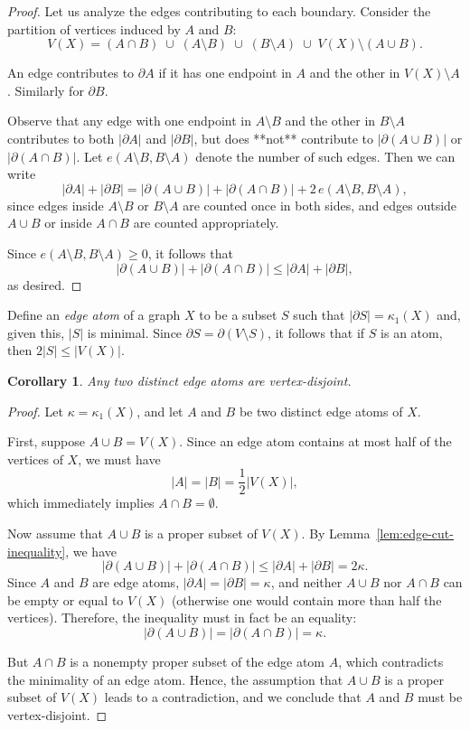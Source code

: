 \documentclass[12pt,a4paper,openany]{book}
\newtheorem{corollary}{Corollary}[section]
\begin{document}
\begin{proof}
Let us analyze the edges contributing to each boundary. Consider the partition of vertices induced by $A$ and $B$:
\[
V(X) = (A \cap B) \;\cup\; (A \setminus B) \;\cup\; (B \setminus A) \;\cup\; V(X) \setminus (A \cup B).
\]

An edge contributes to $\partial A$ if it has one endpoint in $A$ and the other in $V(X)\setminus A$. Similarly for $\partial B$. 

Observe that any edge with one endpoint in $A\setminus B$ and the other in $B\setminus A$ contributes to both $|\partial A|$ and $|\partial B|$, but does **not** contribute to $|\partial(A \cup B)|$ or $|\partial(A \cap B)|$. Let $e(A\setminus B, B\setminus A)$ denote the number of such edges. Then we can write
\[
|\partial A| + |\partial B| = |\partial(A \cup B)| + |\partial(A \cap B)| + 2\, e(A\setminus B, B\setminus A),
\]
since edges inside $A\setminus B$ or $B\setminus A$ are counted once in both sides, and edges outside $A \cup B$ or inside $A \cap B$ are counted appropriately.  

Since $e(A\setminus B, B\setminus A) \ge 0$, it follows that
\[
|\partial(A \cup B)| + |\partial(A \cap B)| \leq |\partial A| + |\partial B|,
\]
as desired.
\end{proof}


Define an \textit{edge atom} of a graph $X$ to be a subset $S$ such that $|\partial S| = \kappa_1(X)$ and, given this, $|S|$ is minimal. Since $\partial S = \partial(V \setminus S)$, it follows that if $S$ is an atom, then $2|S| \leq |V(X)|$.

\begin{corollary}\label{cor:edge-atoms-disjoint}
Any two distinct edge atoms are vertex-disjoint.
\end{corollary}

\begin{proof}
Let $\kappa = \kappa_1(X)$, and let $A$ and $B$ be two distinct edge atoms of $X$. 

First, suppose $A \cup B = V(X)$. Since an edge atom contains at most half of the vertices of $X$, we must have
\[
|A| = |B| = \frac{1}{2}|V(X)|,
\]
which immediately implies $A \cap B = \emptyset$.  

Now assume that $A \cup B$ is a proper subset of $V(X)$. By Lemma~\ref{lem:edge-cut-inequality}, we have
\[
|\partial(A \cup B)| + |\partial(A \cap B)| \leq |\partial A| + |\partial B| = 2\kappa.
\]
Since $A$ and $B$ are edge atoms, $|\partial A| = |\partial B| = \kappa$, and neither $A \cup B$ nor $A \cap B$ can be empty or equal to $V(X)$ (otherwise one would contain more than half the vertices). Therefore, the inequality must in fact be an equality:
\[
|\partial(A \cup B)| = |\partial(A \cap B)| = \kappa.
\]

But $A \cap B$ is a nonempty proper subset of the edge atom $A$, which contradicts the minimality of an edge atom. Hence, the assumption that $A \cup B$ is a proper subset of $V(X)$ leads to a contradiction, and we conclude that $A$ and $B$ must be vertex-disjoint.
\end{proof}
\end{document}
